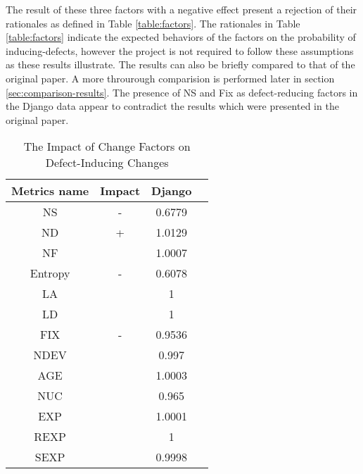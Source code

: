 \documentclass[10pt, conference]{IEEEtran}
\begin{document}
The result of these three factors with a negative effect present a rejection of their rationales as defined in Table \ref{table:factors}. The rationales in Table \ref{table:factors} indicate the expected behaviors of the factors on the probability of inducing-defects, however the project is not required to follow these assumptions as these results illustrate. The results can also be briefly compared to that of the original paper. A more throurough comparision is performed later in section \ref{sec:comparison-results}.  The presence of NS and Fix as defect-reducing factors in the Django data appear to contradict the results which were presented in the original paper.

\begin{table}
	\centering
	\caption{The Impact of Change Factors on Defect-Inducing Changes}
	\begin{tabular}{|c|c|c|c|}
		\hline Metrics name & Impact & Django \\ 
		\hline NS & - & 0.6779 \\ 
		\hline ND & + & 1.0129 \\ 
		\hline NF &  & 1.0007 \\ 
		\hline Entropy & - & 0.6078 \\ 
		\hline LA &  & 1 \\ 
		\hline LD &  & 1 \\ 
		\hline FIX & - & 0.9536 \\ 
		\hline NDEV &  & 0.997 \\ 
		\hline AGE &  & 1.0003 \\ 
		\hline NUC &  & 0.965 \\ 
		\hline EXP &  & 1.0001 \\ 
		\hline REXP &  & 1 \\ 
		\hline SEXP &  & 0.9998 \\ 
		\hline 
	\end{tabular}
	\label{table:odds_ratio}  
\end{table}
\end{document}
